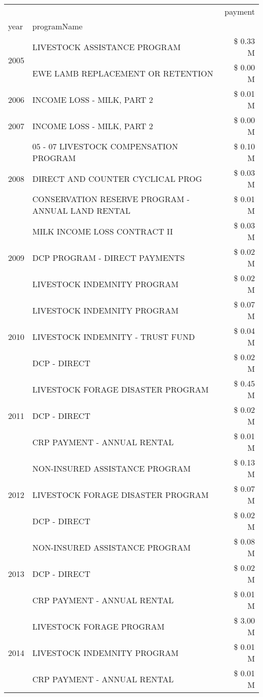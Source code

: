 \begin{tabular}{llr}
\toprule
 &  & payment \\
year & programName &  \\
\midrule
\multirow[t]{2}{*}{2005} & LIVESTOCK ASSISTANCE PROGRAM & \$ 0.33 M \\
 & EWE LAMB REPLACEMENT OR RETENTION & \$ 0.00 M \\
\cline{1-3}
2006 & INCOME LOSS - MILK, PART 2 & \$ 0.01 M \\
\cline{1-3}
2007 & INCOME LOSS - MILK, PART 2 & \$ 0.00 M \\
\cline{1-3}
\multirow[t]{3}{*}{2008} & 05 - 07 LIVESTOCK COMPENSATION PROGRAM & \$ 0.10 M \\
 & DIRECT AND COUNTER CYCLICAL PROG & \$ 0.03 M \\
 & CONSERVATION RESERVE PROGRAM - ANNUAL LAND RENTAL & \$ 0.01 M \\
\cline{1-3}
\multirow[t]{3}{*}{2009} & MILK INCOME LOSS CONTRACT II & \$ 0.03 M \\
 & DCP PROGRAM - DIRECT PAYMENTS & \$ 0.02 M \\
 & LIVESTOCK INDEMNITY PROGRAM & \$ 0.02 M \\
\cline{1-3}
\multirow[t]{3}{*}{2010} & LIVESTOCK INDEMNITY PROGRAM & \$ 0.07 M \\
 & LIVESTOCK INDEMNITY - TRUST FUND & \$ 0.04 M \\
 & DCP - DIRECT & \$ 0.02 M \\
\cline{1-3}
\multirow[t]{3}{*}{2011} & LIVESTOCK FORAGE DISASTER PROGRAM & \$ 0.45 M \\
 & DCP - DIRECT & \$ 0.02 M \\
 & CRP PAYMENT - ANNUAL RENTAL & \$ 0.01 M \\
\cline{1-3}
\multirow[t]{3}{*}{2012} & NON-INSURED ASSISTANCE PROGRAM & \$ 0.13 M \\
 & LIVESTOCK FORAGE DISASTER PROGRAM & \$ 0.07 M \\
 & DCP - DIRECT & \$ 0.02 M \\
\cline{1-3}
\multirow[t]{3}{*}{2013} & NON-INSURED ASSISTANCE PROGRAM & \$ 0.08 M \\
 & DCP - DIRECT & \$ 0.02 M \\
 & CRP PAYMENT - ANNUAL RENTAL & \$ 0.01 M \\
\cline{1-3}
\multirow[t]{3}{*}{2014} & LIVESTOCK FORAGE PROGRAM & \$ 3.00 M \\
 & LIVESTOCK INDEMNITY PROGRAM & \$ 0.01 M \\
 & CRP PAYMENT - ANNUAL RENTAL & \$ 0.01 M \\

\end{tabular}
